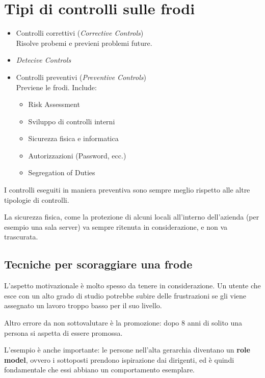 \section{Tipi di controlli sulle frodi}

\begin{itemize}
\item Controlli correttivi (\emph{Corrective Controls}) \\
Risolve probemi e previeni problemi future.
\item \emph{Detecive Controls}\\ 
\item Controlli preventivi (\emph{Preventive Controls})\\
Previene le frodi.
Include:
	\begin{itemize}
	\item Risk Assessment
	\item Sviluppo di controlli interni
	\item Sicurezza fisica e informatica
	\item Autorizzazioni (Password, ecc.)
	\item Segregation of Duties
	\end{itemize}
\end{itemize}

I controlli eseguiti in maniera preventiva sono sempre meglio rispetto alle
altre tipologie di controlli.

La sicurezza fisica, come la protezione di alcuni locali all'interno
dell'azienda (per esempio una sala server) va sempre ritenuta in
considerazione, e non va trascurata.

\subsection{Tecniche per scoraggiare una frode}

L'aspetto motivazionale è molto spesso da tenere in considerazione.
Un utente che esce con un alto grado di studio potrebbe subire delle
frustrazioni se gli viene assegnato un lavoro troppo basso per il suo livello.

Altro errore da non sottovalutare è la promozione: dopo 8 anni di solito una
persona si aspetta di essere promossa.

L'esempio è anche importante: le persone nell'alta gerarchia diventano un
\textbf{role model}, ovvero i sottoposti prendono ispirazione dai dirigenti, ed è
quindi fondamentale che essi abbiano un comportamento esemplare.

